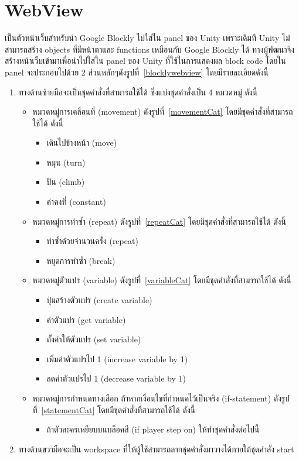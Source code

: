 \section{WebView}
เป็นตัวหน้าเว็บสำหรับนำ Google Blockly ไปใส่ใน panel ของ Unity เพราะเดิมที Unity ไม่สามารถสร้าง objects ที่มีหน้าตาและ functions เหมือนกับ Google Blockly ได้ ทางผู้พัฒนาจึงสร้างหน้าเว็บเข้ามาเพื่อนำไปใส่ใน 
panel ของ Unity ที่ใช้ในการแสดงผล block code โดยใน panel จะประกอบไปด้วย 2 ส่วนหลักๆดังรูปที่~\ref{blocklywebview} โดยมีรายละเอียดดังนี้
\begin{enumerate}
    \item ทางด้านซ้ายมือจะเป็นชุดคำสั่งที่สามารถใช้ได้ ซึ่งแบ่งชุดคำสั่งเป็น 4 หมวดหมู่ ดังนี้
    \begin{itemize}
        \item หมวดหมู่การเคลื่อนที่ (movement) ดังรูปที่~\ref{movementCat} โดยมีชุดคำสั่งที่สามารถใช้ได้ ดังนี้
        \begin{itemize}
            \item เดินไปข้างหน้า (move)
            \item หมุน (turn)
            \item ปีน (climb)
            \item ค่าคงที่ (constant)
        \end{itemize}
        \item หมวดหมู่การทำซ้ำ (repeat) ดังรูปที่~\ref{repeatCat} โดยมีชุดคำสั่งที่สามารถใช้ได้ ดังนี้
        \begin{itemize}
            \item ทำซ้ำด้วยจำนวนครั้ง (repeat)
            \item หยุดการทำซ้ำ (break)
        \end{itemize}
        \item หมวดหมู่ตัวแปร (variable) ดังรูปที่~\ref{variableCat} โดยมีชุดคำสั่งที่สามารถใช้ได้ ดังนี้
        \begin{itemize}
            \item ปุ่มสร้างตัวแปร (create variable)
            \item ค่าตัวแปร (get variable)
            \item ตั้งค่าให้ตัวแปร (set variable)
            \item เพิ่มค่าตัวแปรไป 1 (increase variable by 1)
            \item ลดค่าตัวแปรไป 1 (decrease variable by 1)
        \end{itemize}
        \item หมวดหมู่การกำหนดทางเลือก ถ้าหากเงื่อนไขที่กำหนดไว้เป็นจริง (if-statement) ดังรูปที่~\ref{statementCat} โดยมีชุดคำสั่งที่สามารถใช้ได้ ดังนี้
        \begin{itemize}
            \item ถ้าตัวละครเหยียบบนบล็อคสี (if player step on) ให้ทำชุดคำสั่งต่อไปนี้
        \end{itemize}
    \end{itemize}
    \item ทางด้านขวามือจะเป็น workspace ที่ให้ผู้ใช้สามารถลากชุดคำสั่งมาวางได้ภายใต้ชุดคำสั่ง start
\end{enumerate}

